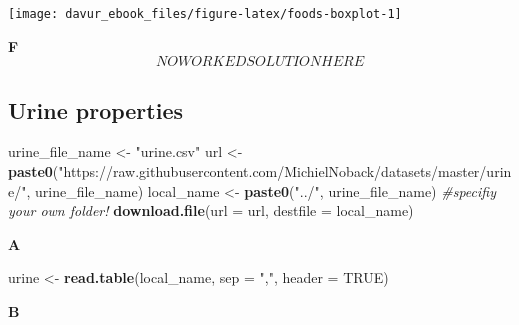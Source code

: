 \documentclass[]{book}
\newenvironment{Shaded}{\begin{snugshade}}{\end{snugshade}}
\newcommand{\CommentTok}[1]{\textcolor[rgb]{0.56,0.35,0.01}{\textit{#1}}}
\newcommand{\DataTypeTok}[1]{\textcolor[rgb]{0.13,0.29,0.53}{#1}}
\newcommand{\DecValTok}[1]{\textcolor[rgb]{0.00,0.00,0.81}{#1}}
\newcommand{\KeywordTok}[1]{\textcolor[rgb]{0.13,0.29,0.53}{\textbf{#1}}}
\newcommand{\NormalTok}[1]{#1}
\newcommand{\OperatorTok}[1]{\textcolor[rgb]{0.81,0.36,0.00}{\textbf{#1}}}
\newcommand{\OtherTok}[1]{\textcolor[rgb]{0.56,0.35,0.01}{#1}}
\newcommand{\StringTok}[1]{\textcolor[rgb]{0.31,0.60,0.02}{#1}}
\begin{document}
\begin{center}\texttt{[image: davur\_ebook\_files/figure-latex/foods-boxplot-1]} \end{center}

\textbf{F}\\
\[NO WORKED SOLUTION HERE\]

\hypertarget{urine-properties-1}{%
\subsection{Urine properties}\label{urine-properties-1}}

\begin{Shaded}
\begin{Highlighting}[]
\NormalTok{urine_file_name <-}\StringTok{ "urine.csv"}
\NormalTok{url <-}\StringTok{ }\KeywordTok{paste0}\NormalTok{(}\StringTok{"https://raw.githubusercontent.com/MichielNoback/datasets/master/urine/"}\NormalTok{, urine_file_name)}
\NormalTok{local_name <-}\StringTok{ }\KeywordTok{paste0}\NormalTok{(}\StringTok{"../"}\NormalTok{, urine_file_name) }\CommentTok{#specifiy your own folder!}
\KeywordTok{download.file}\NormalTok{(}\DataTypeTok{url =}\NormalTok{ url, }\DataTypeTok{destfile =}\NormalTok{ local_name)}
\end{Highlighting}
\end{Shaded}

\textbf{A}

\begin{Shaded}
\begin{Highlighting}[]
\NormalTok{urine <-}\StringTok{ }\KeywordTok{read.table}\NormalTok{(local_name, }
                     \DataTypeTok{sep =} \StringTok{","}\NormalTok{,}
                     \DataTypeTok{header =} \OtherTok{TRUE}\NormalTok{)}
\end{Highlighting}
\end{Shaded}

\textbf{B}

\begin{Shaded}
\end{Shaded}
\end{document}
